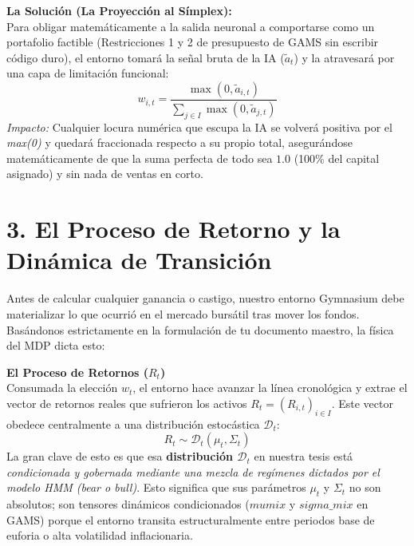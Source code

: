\documentclass[11pt]{article}
\begin{document}
\textbf{La Solución (La Proyección al Símplex):}\\
Para obligar matemáticamente a la salida neuronal a comportarse como un portafolio factible (Restricciones 1 y 2 de presupuesto de GAMS sin escribir código duro), el entorno tomará la señal bruta de la IA ($\tilde{a}_t$) y la atravesará por una capa de limitación funcional:
\begin{equation}
w_{i,t} = \frac{\max(0, \tilde{a}_{i,t})}{\sum_{j \in I} \max(0, \tilde{a}_{j,t})}
\end{equation}
\textit{Impacto:} Cualquier locura numérica que escupa la IA se volverá positiva por el \textit{max(0)} y quedará fraccionada respecto a su propio total, asegurándose matemáticamente de que la suma perfecta de todo sea $\mathbf{1.0}$ (100\% del capital asignado) y sin nada de ventas en corto.

\section{3. El Proceso de Retorno y la Dinámica de Transición}
Antes de calcular cualquier ganancia o castigo, nuestro entorno Gymnasium debe materializar lo que ocurrió en el mercado bursátil tras mover los fondos. Basándonos estrictamente en la formulación de tu documento maestro, la física del MDP dicta esto:

\vspace{1mm}
\noindent\textbf{El Proceso de Retornos ($R_t$)} \\
Consumada la elección $w_t$, el entorno hace avanzar la línea cronológica y extrae el vector de retornos reales que sufrieron los activos $R_t = (R_{i,t})_{i \in I}$. Este vector obedece centralmente a una distribución estocástica $\mathcal{D}_t$:
\begin{equation}
    R_t \sim \mathcal{D}_t(\mu_t, \Sigma_t)
\end{equation}
La gran clave de esto es que esa \textbf{distribución $\mathcal{D}_t$} en nuestra tesis está \textit{condicionada y gobernada mediante una mezcla de regímenes dictados por el modelo HMM (bear o bull)}. Esto significa que sus parámetros $\mu_t$ y $\Sigma_t$ no son absolutos; son tensores dinámicos condicionados ($mumix$ y $sigma\_mix$ en GAMS) porque el entorno transita estructuralmente entre periodos base de euforia o alta volatilidad inflacionaria.
\end{document}

